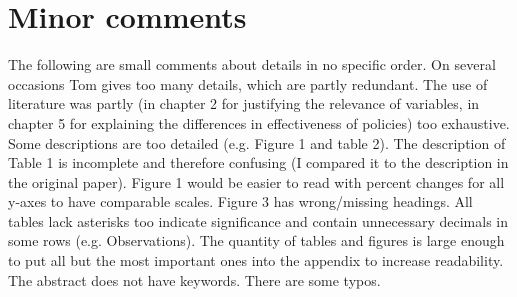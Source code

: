 \documentclass[11pt]{article}
\begin{document}
\section{Minor comments}
The following are small comments about details in no specific order. On several occasions Tom gives too many details, which are partly redundant. The use of literature was partly (in chapter 2 for justifying the relevance of variables, in chapter 5 for explaining the differences in effectiveness of policies) too exhaustive. Some descriptions are too detailed (e.g. Figure 1 and table 2). The description of Table 1 is incomplete and therefore confusing (I compared it to the description in the original paper). Figure 1 would be easier to read with percent changes for all y-axes to have comparable scales. Figure 3 has wrong/missing headings. All tables lack asterisks too indicate significance and contain unnecessary decimals in some rows (e.g. Observations). The quantity of tables and figures is large enough to put all but the most important ones into the appendix to increase readability. The abstract does not have keywords. There are some typos.


\end{document}
